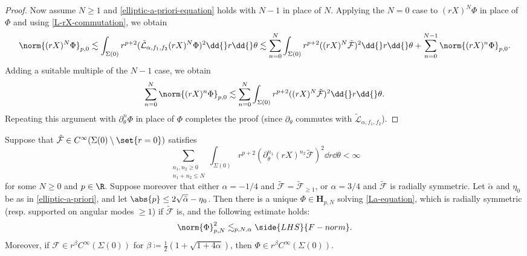 \documentclass[10pt, reqno]{amsart}
\begin{document}
\begin{proof}
 Now assume \(N\ge 1\) and
\cref{elliptic-a-priori-equation} holds with \(N - 1\) in place of \(N\). Applying the \(N = 0\) case to \((rX)^N\Phi{}\) in place
of \(\Phi{}\) and using \cref{L-rX-commutation}, we obtain
\begin{equation}
\begin{split}
\norm{(rX)^N\Phi{}}_{p,0}\lesssim \int _{\Sigma{}(0)} r^{p+2}(\tilde{\mathcal{L}}_{\alpha{},f_1,f_2}(rX)^N\Phi{})^2 \dd{}r\dd{}\theta{}\lesssim \sum_{n=0}^N \int _{\Sigma{}(0)} r^{p+2}((rX)^N \tilde{\mathcal{F}})^2 \dd{}r\dd{}\theta{} +\sum_{n=0}^{N-1} \norm{(rX)^n\Phi{}}_{p,0}.
\end{split}
\end{equation}
Adding a suitable multiple of the \(N-1\) case, we obtain
\begin{equation}
\sum_{n=0}^N\norm{(rX)^n\Phi{}}_{p,0}\lesssim \sum_{n=0}^N \int _{\Sigma{}(0)} r^{p+2}((rX)^N \tilde{\mathcal{F}})^2 \dd{}r\dd{}\theta{}.
\end{equation}
Repeating this argument with \(\partial_\theta^n\Phi{}\) in place of \(\Phi{}\) completes the proof (since \(\partial_\theta{}\)
commutes with \(\tilde{\mathcal{L}}_{\alpha{},f_1,f_2}\)).
\end{proof}
\begin{proposition}
Suppose that \(\tilde{\mathcal{F}}\in C^\infty(\Sigma{}(0)\setminus
\set{r=0})\) satisfies
\begin{equation}\label{F-norm}
\sum_{\substack{n_1,n_2\ge 0\\n_1+n_2\le N}}\int _{\Sigma{}(0)}r^{p+2}(\partial{}_\theta^{n_1}(rX)^{n_2} \tilde{\mathcal{F}})^2 \dd{}r\dd{}\theta{}< \infty
\end{equation}
for some \(N\ge 0\) and \(p\in \R\). Suppose moreover that either \(\alpha{} = -1/4\) and
\(\tilde{\mathcal{F}} = \tilde{\mathcal{F}}_{\ge 1}\), or \(\alpha{} = 3/4\) and
\(\tilde{\mathcal{F}}\) is radially symmetric. Let \(\tilde{\alpha{}}\) and \(\eta_0\) be as
in \cref{elliptic-a-priori}, and let \(\abs{p}\le 2\sqrt{\tilde{\alpha{}}} -
\eta{}_0\). Then there is a unique \(\Phi{}\in \mathbf{H}_{p,N}\) solving
\cref{La-equation}, which is radially symmetric (resp. supported on angular modes \(\ge
1\)) if \(\tilde{\mathcal{F}}\) is, and the following estimate holds:
\begin{equation}\label{F-norm-estimate-goal}
\norm{\Phi{}}_{p,N}^2 \lesssim_{p,N,\alpha{}} \side{LHS}{F-norm}.
\end{equation}
Moreover, if \(\mathcal{F}\in r^\beta{}C^\infty(\Sigma{}(0))\) for \(\beta{} \coloneqq{} \frac{1}{2}(1 +
\sqrt{1 + 4\alpha{}})\), then \(\Phi{}\in r^\beta{}C^\infty(\Sigma{}(0))\).
\label{good-scalar-field-Linv}
\end{proposition}
\end{document}
